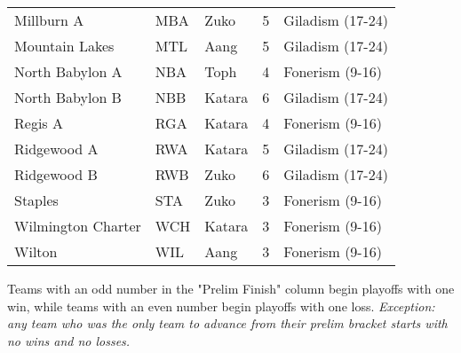\documentclass{article}%
\begin{document}
\begin{longtable}{|ll|lc|l|}
Millburn A&MBA&Zuko&5&Giladism (17{-}24)\\%
Mountain Lakes&MTL&Aang&5&Giladism (17{-}24)\\%
North Babylon A&NBA&Toph&4&Fonerism (9{-}16)\\%
North Babylon B&NBB&Katara&6&Giladism (17{-}24)\\%
Regis A&RGA&Katara&4&Fonerism (9{-}16)\\%
Ridgewood A&RWA&Katara&5&Giladism (17{-}24)\\%
Ridgewood B&RWB&Zuko&6&Giladism (17{-}24)\\%
Staples&STA&Zuko&3&Fonerism (9{-}16)\\%
Wilmington Charter&WCH&Katara&3&Fonerism (9{-}16)\\%
Wilton&WIL&Aang&3&Fonerism (9{-}16)\\%
\end{longtable}%
Teams with an odd number in the "Prelim Finish" column begin playoffs with one win, while teams with an even number begin playoffs with one loss.%
\textit{ Exception: any team who was the only team to advance from their prelim bracket starts with no wins and no losses.}%
\end{document}
